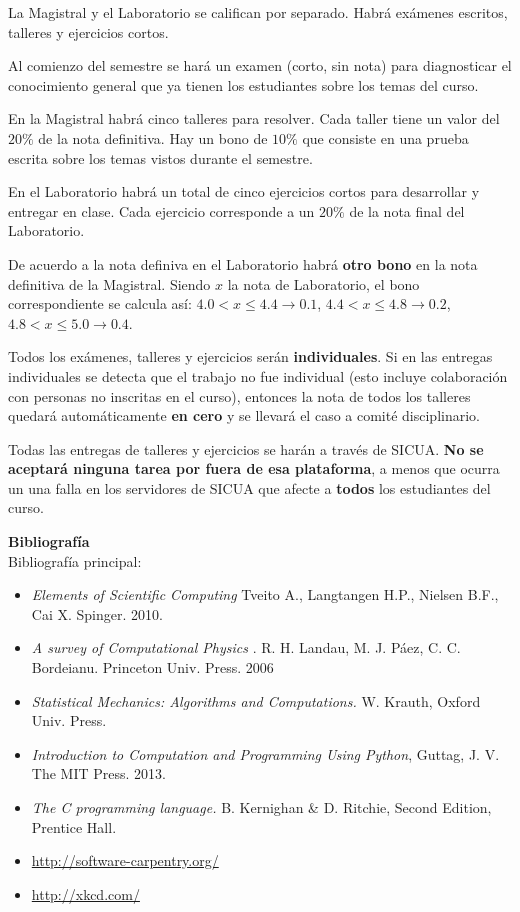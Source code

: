 \documentclass[letterpaper,10pt,onecolumn]{article}
\begin{document}
La Magistral y el Laboratorio se califican por separado. 
Habr\'a ex\'amenes escritos, talleres y ejercicios cortos.

Al comienzo del semestre se har\'a un examen (corto, sin nota) para
diagnosticar el conocimiento general que ya tienen los estudiantes
sobre los temas del curso. 

En la Magistral habr\'a cinco talleres para resolver.
Cada taller tiene un valor del $20\%$ de la nota definitiva.  
Hay un bono de $10\%$ que consiste en una prueba escrita sobre
los temas vistos durante el semestre.

En el Laboratorio habr\'a un total de cinco ejercicios
cortos para desarrollar y entregar en clase. 
Cada ejercicio corresponde a un $20\%$ de la nota final del
Laboratorio. 

De acuerdo a la nota definiva en el Laboratorio habr\'a {\bf otro bono} en la
nota definitiva de la Magistral. 
Siendo $x$ la nota de Laboratorio, el bono correspondiente
se calcula as\'i:
$4.0 < x \leq 4.4 \rightarrow 0.1$, $4.4< x\leq 4.8\rightarrow 0.2$, $4.8<x
\leq 5.0\rightarrow 0.4$.

Todos los ex\'amenes, talleres y ejercicios ser\'an
\textbf{individuales}.  
Si en las entregas individuales se detecta que el trabajo no fue
individual (esto incluye colaboraci\'on con personas no inscritas en
el curso), entonces la nota de todos los talleres quedar\'a
autom\'aticamente {\bf en cero} y se llevar\'a el caso a comit\'e
disciplinario. 

Todas las entregas de talleres y ejercicios se har\'an a trav\'es de
SICUA.  {\bf No se aceptar\'a ninguna tarea por fuera de esa
  plataforma}, a menos que ocurra un una falla en los servidores de
SICUA que afecte a {\bf todos} los estudiantes del curso.



\noindent\textbf{\large {} \quad
  Bibliograf\'ia}\\[-0.2cm] 



\noindent\normalsize Bibliograf\'ia principal:

\begin{itemize}
\item
\textit{Elements of Scientific Computing}
Tveito A., Langtangen H.P., Nielsen B.F., Cai X. Spinger. 2010.
\item
\textit{A survey of Computational Physics}
. R. H. Landau, M. J. P\'aez, C. C. Bordeianu. Princeton Univ. Press. 2006
\item 
\textit{Statistical Mechanics: Algorithms and Computations.}
W. Krauth, Oxford Univ. Press. 
\item 
\textit{Introduction to Computation and Programming Using Python},
Guttag, J. V. The MIT Press. 2013.
\item 
\textit{The C programming language.}
 B. Kernighan \& D. Ritchie, Second Edition, Prentice Hall.
\item\url{http://software-carpentry.org/}
\item\url{http://xkcd.com/}
\end{itemize}
\end{document}
